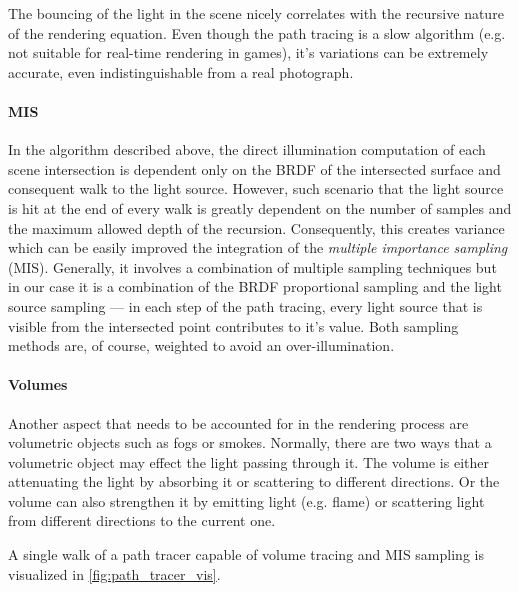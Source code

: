 The bouncing of the light in the scene nicely correlates with the recursive nature of the rendering equation. Even though the path tracing is a slow algorithm (e.g. not suitable for real-time rendering in games), it's variations can be extremely accurate, even indistinguishable from a real photograph. 


\paragraph{MIS}

In the algorithm described above, the direct illumination computation of each scene intersection is dependent only on the BRDF of the intersected surface and consequent walk to the light source. However, such scenario that the light source is hit at the end of every walk is greatly dependent on the number of samples and the maximum allowed depth of the recursion. Consequently, this creates variance which can be easily improved the integration of the \emph{multiple importance sampling} (MIS). Generally, it involves a combination of multiple sampling techniques but in our case it is a combination of the BRDF proportional sampling and the light source sampling --- in each step of the path tracing, every light source that is visible from the intersected point contributes to it's value. Both sampling methods are, of course, weighted to avoid an over-illumination. 

\paragraph{Volumes}

Another aspect that needs to be accounted for in the rendering process are volumetric objects such as fogs or smokes. Normally, there are two ways that a volumetric object may effect the light passing through it. The volume is either attenuating the light by absorbing it or scattering to different directions. Or the volume can also strengthen it by emitting light (e.g. flame) or scattering light from different directions to the current one.

A single walk of a path tracer capable of volume tracing and MIS sampling is visualized in \autoref{fig:path_tracer_vis}.

